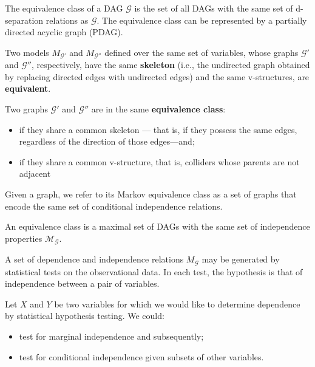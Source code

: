 The equivalence class of a DAG $\mathcal{G}$ is the set of all DAGs with the same
set of d-separation relations as $\mathcal{G}$. The equivalence class can be represented
by a partially directed acyclic graph (PDAG).

\begin{definition}
    Two models $M_\mathcal{G'}$ and $M_\mathcal{G''}$ defined over the same set
    of variables, whose graphs $\mathcal{G'}$ and $\mathcal{G''}$, respectively,
    have the same \textbf{skeleton} (i.e., the undirected graph obtained by replacing
    directed edges with undirected edges) and the same v-structures, are \textbf{equivalent}.

    Two graphs $\mathcal{G'}$ and $\mathcal{G''}$ are in the same \textbf{equivalence class}:
    \begin{itemize}
        \item if they share a common skeleton — that is, if they possess the same
              edges, regardless of the direction of those edges—and;
        \item if they share a common v-structure, that is, colliders whose parents
              are not adjacent
    \end{itemize}
\end{definition}

Given a graph, we refer to its Markov equivalence class as a set of graphs that
encode the same set of conditional independence relations.

\begin{definition}
    An equivalence class is a maximal set of DAGs with the same set of independence
    properties $\mathcal{M}_{\mathcal{G}}$.
\end{definition}

A set of dependence and independence relations $M_{\mathcal{G}}$ may be generated
by statistical tests on the observational data. In each test, the hypothesis is
that of independence between a pair of variables.

Let $X$ and $Y$ be two variables for which we would like to determine dependence
by statistical hypothesis testing. We could:
\begin{itemize}
    \item test for marginal independence and subsequently;
    \item test for conditional independence given subsets of other variables.
\end{itemize}
